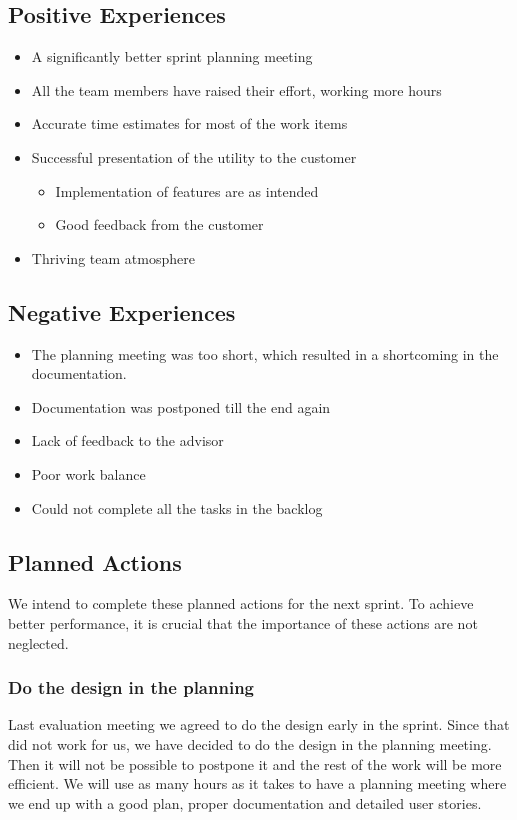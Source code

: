 \subsection{Positive Experiences}
\begin{itemize}
	\item A significantly better sprint planning meeting
	\item All the team members have raised their effort, working more hours
	\item Accurate time estimates for most of the work items
	\item Successful presentation of the \gls{utility} to the customer
	\begin {itemize}
		\item Implementation of features are as intended
		\item Good feedback from the customer
	\end{itemize}
	\item Thriving team atmosphere
\end{itemize}

\subsection{Negative Experiences}
\begin{itemize}
	\item The planning meeting was too short, which resulted in a shortcoming in the documentation.
	\item Documentation was postponed till the end again
	\item Lack of feedback to the advisor
	\item Poor work balance
	\item Could not complete all the tasks in the backlog
\end{itemize}

\subsection{Planned Actions}
We intend to complete these planned actions for the next sprint. To achieve better performance, it is crucial that the importance of these actions are not neglected.

\subsubsection{Do the design in the planning}
Last evaluation meeting we agreed to do the design early in the sprint. Since that did not work for us, we have decided to do the design in the planning meeting. Then it will not be possible to postpone it and the rest of the work will be more efficient. We will use as many hours as it takes to have a planning meeting where we end up with a good plan, proper documentation and detailed user stories.

